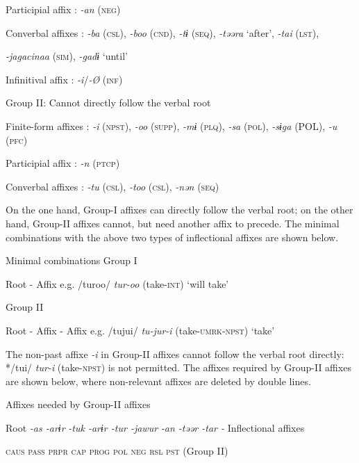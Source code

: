     Participial affix  : \textit{-an} (\textsc{neg})

    Converbal affixes  : \textit{-ba} (\textsc{csl}), \textit{-boo} (\textsc{cnd}), \textit{-tɨ} (\textsc{seq}), \textit{-təəra} ‘after’, \textit{-tai} (\textsc{lst}),

\textit{-jagacinaa} (\textsc{sim}), \textit{-gadɨ} ‘until’

    Infinitival affix  : \textit{-i}/\textit{-Ø} (\textsc{inf})


\ex Group II: Cannot directly follow the verbal root

    Finite-form affixes  : \textit{-i} (\textsc{npst}), \textit{-oo} (\textsc{supp}), \textit{-mɨ} (\textsc{plq}), \textit{-sa} (\textsc{pol}), \textit{-sɨga} (POL), \textit{-u} (\textsc{pfc})

    Participial affix  : \textit{-n} (\textsc{ptcp})

    Converbal affixes  : \textit{-tu} (\textsc{csl}), \textit{-too} (\textsc{csl}), \textit{-nən} (\textsc{seq})
\z
\z

On the one hand, Group-I affixes can directly follow the verbal root; on the other hand, Group-II affixes cannot, but need another affix to precede. The minimal combinations with the above two types of inflectional affixes are shown below.

\ea\label{ex:8-4}
  Minimal combinations
\ea Group I

    Root  -  Affix        e.g.  /turoo/  \textit{tur-oo}  (take-\textsc{int})  ‘will take’


\ex Group II

    Root  -  Affix  -  Affix    e.g.  /tujui/  \textit{tu-jur-i}  (take-\textsc{umrk}-\textsc{npst})  ‘take’
\z
\z

The non-past affixe \textit{-i} in Group-II affixes cannot follow the verbal root directly: */tui/ \textit{tur-i} (take-\textsc{npst}) is not permitted. The affixes required by Group-II affixes are shown below, where non-relevant affixes are deleted by double lines.

\ea\label{ex:8-5}
  Affixes needed by Group-II affixes

  Root  \textit{-as  -arɨr} %
\textit{-tuk  -arɨr  -tur  -jawur} %
\textit{-an  -təər  -tar  -} Inflectional affixes

    \textsc{caus}  \textsc{pass}  \textsc{prpr}  \textsc{cap}  \textsc{prog}  \textsc{pol}  \textsc{neg}  \textsc{rsl}  \textsc{pst}  (Group II)

